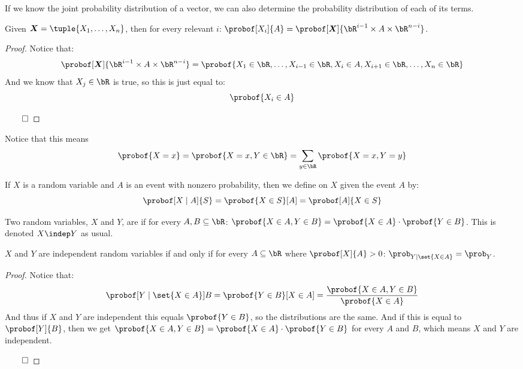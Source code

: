 If we know the joint probability distribution of a vector, we can also determine the probability distribution of each of its terms.

\begin{prop*}

	Given $\jpv=\tuple{X_1,\dots,X_n}$, then for every relevant $i$: $\probof[X_i]{A}=\probof[\jpv]{\bR^{i-1}\times A\times\bR^{n-i}}$.

\end{prop*}

\begin{proof}

	Notice that:
	\[ \probof[\jpv]{\bR^{i-1}\times A\times\bR^{n-i}} = \probof{X_1\in\bR,\dots,X_{i-1}\in\bR, X_i\in A, X_{i+1}\in\bR,\dots,X_n\in\bR} \]
	And we know that $X_j\in\bR$ is true, so this is just equal to:
	\[ \probof{X_i\in A} \]

\hfill$\qed$

\end{proof}

Notice that this means 
\[ \probof{X=x}=\probof{X=x, Y\in\bR} = \sum_{y\in\bR}\probof{X=x, Y=y} \]

\begin{defn*}

	If $X$ is a random variable and $A$ is an event with nonzero probability, then we define  on $X$ given the
	event $A$ by:
	\[ \probof[X\mid A]{S} = \probof{X\in S}[A] = \probof[A]{X\in S} \]

\end{defn*}

\begin{defn*}

	Two random variables, $X$ and $Y$, are  if for every $A,B\subseteq\bR$:
	$\probof{X\in A, Y\in B}=\probof{X\in A}\cdot\probof{Y\in B}$.
	This is denoted $X\indep Y$ as usual.

\end{defn*}

\begin{prop*}

	$X$ and $Y$ are independent random variables if and only if for every $A\subseteq\bR$ where $\probof[X]{A}>0$:
	$\prob_{Y\mid\set{X\in A}}=\prob_Y$.

\end{prop*}

\begin{proof}

	Notice that:
	\[ \probof[Y\mid\set{X\in A}]{B} = \probof{Y\in B}[X\in A] = \frac{\probof{X\in A,Y\in B}}{\probof{X\in A}} \]
	And thus if $X$ and $Y$ are independent this equals $\probof{Y\in B}$, so the distributions are the same.
	And if this is equal to $\probof[Y]{B}$, then we get $\probof{X\in A,Y\in B}=\probof{X\in A}\cdot\probof{Y\in B}$ for every $A$ and $B$,
	which means $X$ and $Y$ are independent.

\hfill$\qed$

\end{proof}

